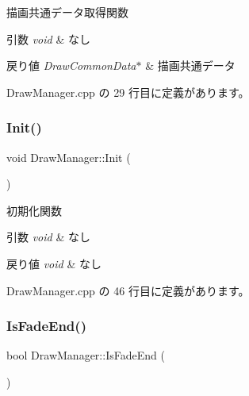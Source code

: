 描画共通データ取得関数 


\begin{DoxyParams}{引数}
{\em void} & なし \\
\hline
\end{DoxyParams}

\begin{DoxyRetVals}{戻り値}
{\em Draw\+Common\+Data$\ast$} & 描画共通データ \\
\hline
\end{DoxyRetVals}


 Draw\+Manager.\+cpp の 29 行目に定義があります。

\mbox{\label{class_draw_manager_a3cb9319d492285bd9dfc983d27e5d04f}} 
\subsubsection{\texorpdfstring{Init()}{Init()}}
{\footnotesize\ttfamily void Draw\+Manager\+::\+Init (\begin{DoxyParamCaption}{ }\end{DoxyParamCaption})}



初期化関数 


\begin{DoxyParams}{引数}
{\em void} & なし \\
\hline
\end{DoxyParams}

\begin{DoxyRetVals}{戻り値}
{\em void} & なし \\
\hline
\end{DoxyRetVals}


 Draw\+Manager.\+cpp の 46 行目に定義があります。

\mbox{\label{class_draw_manager_afc50e8dbf21ffdf6d7a076e0027cae09}} 
\subsubsection{\texorpdfstring{Is\+Fade\+End()}{IsFadeEnd()}}
{\footnotesize\ttfamily bool Draw\+Manager\+::\+Is\+Fade\+End (\begin{DoxyParamCaption}{ }\end{DoxyParamCaption})}



